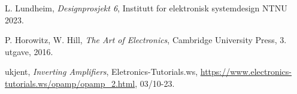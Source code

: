 
  L. Lundheim,
  \emph{Designprosjekt 6},
  Institutt for elektronisk systemdesign NTNU
  2023.

  P. Horowitz, W. Hill,
  \emph{The Art of Electronics},
  Cambridge University Press,
  3. utgave,
  2016.

  ukjent,
  \emph{Inverting Amplifiers},
  Eletronics-Tutorials.ws,
  \url{https://www.electronics-tutorials.ws/opamp/opamp_2.html},
  03/10-23.
